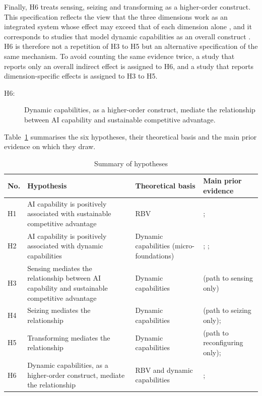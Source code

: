Finally, H6 treats sensing, seizing and transforming as a higher-order construct. This specification reflects the view that the three dimensions work as an integrated system whose effect may exceed that of each dimension alone \parencite{teece2007}, and it corresponds to studies that model dynamic capabilities as an overall construct \parencite{mikalef2020, selgascors2026}. H6 is therefore not a repetition of H3 to H5 but an alternative specification of the same mechanism. To avoid counting the same evidence twice, a study that reports only an overall indirect effect is assigned to H6, and a study that reports dimension-specific effects is assigned to H3 to H5.

\begin{description}
  \item[H6:] Dynamic capabilities, as a higher-order construct, mediate the relationship between AI capability and sustainable competitive advantage.
\end{description}

Table~\ref{tab:hypotheses} summarises the six hypotheses, their theoretical basis and the main prior evidence on which they draw.

\begin{table}[htbp]
\centering
\caption{Summary of hypotheses}
\label{tab:hypotheses}
\footnotesize
\renewcommand{\arraystretch}{1.1}\setlength{\tabcolsep}{4pt}
\begin{tabularx}{\textwidth}{|p{0.7cm}|>{\raggedright\arraybackslash}X|>{\raggedright\arraybackslash}p{2.6cm}|>{\raggedright\arraybackslash}p{3.6cm}|}
\hline
\textbf{No.} & \textbf{Hypothesis} & \textbf{Theoretical basis} & \textbf{Main prior evidence} \\
\hline
H1 & AI capability is positively associated with sustainable competitive advantage & RBV & \textcite{shao2026}; \textcite{chen2022} \\ \hline
H2 & AI capability is positively associated with dynamic capabilities & Dynamic capabilities (micro-foundations) & \textcite{almheiri2025}; \textcite{le2024}; \textcite{mikalef2021b2b} \\ \hline
H3 & Sensing mediates the relationship between AI capability and sustainable competitive advantage & Dynamic capabilities & \textcite{selgascors2026} (path to sensing only) \\ \hline
H4 & Seizing mediates the relationship & Dynamic capabilities & \textcite{selgascors2026} (path to seizing only); \textcite{neiroukh2025} \\ \hline
H5 & Transforming mediates the relationship & Dynamic capabilities & \textcite{selgascors2026} (path to reconfiguring only); \textcite{shao2026} \\ \hline
H6 & Dynamic capabilities, as a higher-order construct, mediate the relationship & RBV and dynamic capabilities & \textcite{selgascors2026}; \textcite{mikalef2020} \\
\hline
\end{tabularx}
\end{table}

